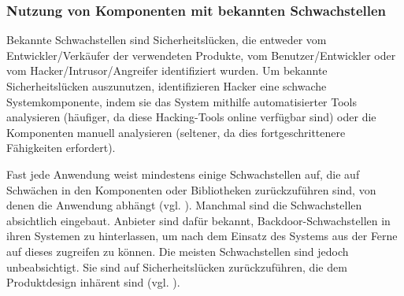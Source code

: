 \subsubsection{Nutzung von Komponenten mit bekannten Schwachstellen}

Bekannte Schwachstellen sind Sicherheitslücken, die entweder vom
Entwickler/Verkäufer der verwendeten Produkte, vom
Benutzer/Entwickler oder vom Hacker/Intrusor/Angreifer identifiziert
wurden. Um bekannte Sicherheitslücken auszunutzen, identifizieren Hacker
eine schwache Systemkomponente, indem sie das System mithilfe
automatisierter Tools analysieren (häufiger, da diese Hacking-Tools
online verfügbar sind) oder die Komponenten manuell analysieren
(seltener, da dies fortgeschrittenere Fähigkeiten erfordert).


Fast jede Anwendung weist mindestens einige Schwachstellen auf,
die auf Schwächen in den Komponenten oder Bibliotheken zurückzuführen
sind, von denen die Anwendung abhängt (vgl. \cite{owasp-comp}).
Manchmal sind die Schwachstellen absichtlich eingebaut. Anbieter sind
dafür bekannt, Backdoor-Schwachstellen in ihren Systemen zu hinterlassen,
um nach dem Einsatz des Systems aus der Ferne auf dieses zugreifen zu
können. Die meisten Schwachstellen sind jedoch unbeabsichtigt. Sie sind
auf Sicherheitslücken zurückzuführen, die dem Produktdesign inhärent
sind (vgl. \cite{owasp-comp}).

